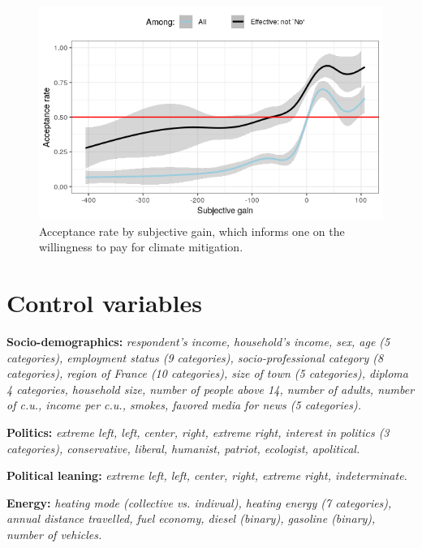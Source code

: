 \documentclass[12pt]{article} %
\begin{document}
\begin{appendices}
\begin{figure}[H]
\centering
\includegraphics[width=0.7\columnwidth]{Images/WTP_Both.png}
\caption{Acceptance rate by subjective gain, which informs one on the willingness to pay for climate mitigation.} %
\label{fig:WTP}
\end{figure}



\section{Control variables}\label{set_controls}

\textbf{Socio-demographics:} \textit{respondent's income, household's income, sex, age \textnormal{(5 categories)}, employment status \textnormal{(9 categories)}, socio-professional category \textnormal{(8 categories)}, region of France \textnormal{(10 categories)}, size of town \textnormal{(5 categories)}, diploma \textnormal{4 categories}, household size, number of people above 14, number of adults, number of c.u., income per c.u., smokes, favored media for news \textnormal{(5 categories)}.}

\vspace{0.5cm}

\noindent
\textbf{Politics:} \textit{extreme left, left, center, right, extreme right, interest in politics \textnormal{(3 categories)}, conservative, liberal, humanist, patriot, ecologist, apolitical.}

\vspace{0.5cm}

\noindent
\textbf{Political leaning:} \textit{extreme left, left, center, right, extreme right, indeterminate.}

\vspace{0.5cm}

\noindent
\textbf{Energy:} \textit{heating mode \textnormal{(collective vs. indivual)}, heating energy \textnormal{(7 categories)}, annual distance travelled, fuel economy, diesel \textnormal{(binary)}, gasoline \textnormal{(binary)}, number of vehicles.}


\end{appendices}
\end{document}
